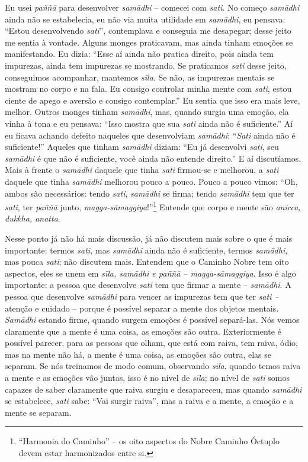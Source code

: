 Eu usei \textit{paññā} para desenvolver \textit{samādhi} –
comecei com \textit{sati}. No começo \textit{samādhi} ainda não se
estabelecia, eu não via muita utilidade em \textit{samādhi}, eu
pensava: “Estou desenvolvendo \textit{sati}”, contemplava e conseguia
me desapegar; desse jeito me sentia à vontade. Alguns monges
praticavam, mas ainda tinham emoções se manifestando. Eu dizia: “Esse
aí ainda não pratica direito, pois ainda tem impurezas, ainda tem
impurezas se mostrando. Se praticamos \textit{sati} desse jeito,
conseguimos acompanhar, mantemos \textit{sīla}. Se não, as impurezas
mentais se mostram no corpo e na fala. Eu consigo controlar minha mente
com \textit{sati}, estou ciente de apego e aversão e consigo
contemplar.” Eu sentia que isso era mais leve, melhor. Outros monges
tinham \textit{samādhi}, mas, quando surgia uma emoção, ela vinha à
tona e eu pensava: “Isso mostra que sua \textit{sati} ainda não é
suficiente.” Aí eu ficava achando defeito naqueles que desenvolviam
\textit{samādhi}: “\textit{Sati} ainda não é suficiente!” Aqueles que
tinham \textit{samādhi} diziam: “Eu já desenvolvi \textit{sati}, seu
\textit{samādhi} é que não é suficiente, você ainda não entende
direito.” E aí discutíamos. Mais à frente o \textit{samādhi} daquele
que tinha \textit{sati} firmou-se e melhorou, a \textit{sati} daquele
que tinha \textit{samādhi} melhorou pouco a pouco. Pouco a pouco
vimos: “Oh, ambos são necessários: tendo \textit{sati},
\textit{samādhi} se firma; tendo \textit{samādhi} tem que ter
\textit{sati}, ter \textit{paññā} junto,
\textit{magga-sāmaggiya}!”\footnote{“Harmonia do Caminho” -- os oito
aspectos do Nobre Caminho Óctuplo devem estar harmonizados entre si.}
Entende que corpo e mente são \textit{anicca, dukkha, anatta}. 

Nesse ponto já não há mais discussão, já não discutem mais sobre o
que é mais importante: termos \textit{sati,} mas \textit{samādhi}
ainda não é suficiente, termos \textit{samādhi,} mas pouca
\textit{sati}; não discutem mais. Entendem que o Caminho Nobre tem oito
aspectos, eles se unem em \textit{sīla, samādhi e paññā –
magga-sāmaggiya}. Isso é algo importante: a pessoa que desenvolve
\textit{sati} tem que firmar a mente – \textit{samādhi}. A pessoa que
desenvolve \textit{samādhi} para vencer as impurezas tem que ter
\textit{sati –} atenção e cuidado – porque é possível separar a mente
dos objetos mentais. \textit{Samādhi} estando firme, quando surgem
emoções é possível separá-las. Nós vemos claramente que a mente é uma
coisa, as emoções são outra. Exteriormente é possível parecer, para as
pessoas que olham, que está com raiva, tem raiva, ódio, mas na mente
não há, a mente é uma coisa, as emoções são outra, elas se separam. Se
nós treinamos de modo comum, observando \textit{sīla}, quando temos
raiva a mente e as emoções vão juntas, isso é no nível de
\textit{sīla}; no nível de \textit{sati} somos capazes de saber
claramente que raiva surgiu e desapareceu, mas quando
\textit{samādhi} se estabelece, \textit{sati} sabe: “Vai surgir
raiva”, mas a raiva e a mente, a emoção e a mente se separam. 

